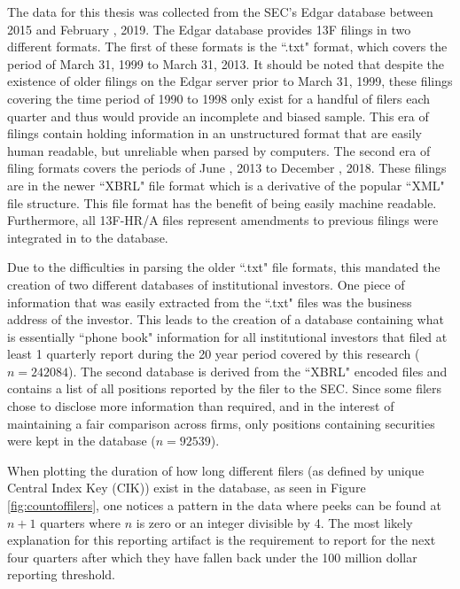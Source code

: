 The data for this thesis was collected from the SEC's Edgar database between 2015 and February , 2019.  The Edgar database provides 13F filings in two different formats.  The first of these formats is the ``.txt" format, which covers the period of March 31, 1999 to March 31, 2013. It should be noted that despite the existence of older filings on the Edgar server prior to March 31, 1999, these filings covering the time period of 1990 to 1998 only exist for a handful of filers each quarter and thus would provide an incomplete and biased sample.  This era of filings contain holding information in an unstructured format that are easily human readable, but unreliable when parsed by computers.  The second era of filing formats covers the periods of June , 2013 to December , 2018.  These filings are in the newer ``XBRL" file format which is a derivative of the popular ``XML" file structure.  This file format has the benefit of being easily machine readable.  Furthermore, all 13F-HR/A files represent amendments to previous filings were integrated in to the database. 

Due to the difficulties in parsing the older ``.txt" file formats, this mandated the creation of two different databases of institutional investors.  One piece of information that was easily extracted from the ``.txt" files was the business address of the investor.  This leads to the creation of a database containing what is essentially ``phone book" information for all institutional investors that filed at least 1 quarterly report during the 20 year period covered by this research ($n = 242084$). The second database is derived from the ``XBRL" encoded files and contains a list of all positions reported by the filer to the SEC. Since some filers chose to disclose more information than required, and in the interest of maintaining a fair comparison across firms, only positions containing securities were kept in the database ($n=92539$).  

\label{Section:13F}

When plotting the duration of how long different filers (as defined by unique Central Index Key (CIK)) exist in the database, as seen in Figure \ref{fig:countoffilers}, one notices a pattern in the data where peeks can be found at $n+1$ quarters where $n$ is zero or an integer divisible by 4.  The most likely explanation for this reporting artifact is the requirement to report for the next four quarters after which they have fallen back under the 100 million dollar reporting threshold.   

